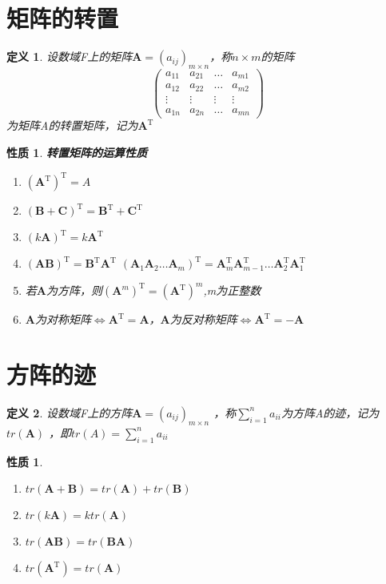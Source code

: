 \documentclass[a4paper]{ctexbook}
\newtheorem{definition}{定义}[section]
\newtheorem{property}[section]{性质}
\begin{document}
\section{矩阵的转置}
\begin{definition}
    设数域F上的矩阵\(\mathbf{A}=(a_{ij})_{m\times n}\)，称\(n\times m\)的矩阵
    \[\begin{pmatrix}
        a_{11}&a_{21}&\dots&a_{m1}
        \\a_{12}&a_{22}&\dots&a_{m2}
        \\ \vdots &\vdots &\vdots &\vdots
        \\a_{1n}&a_{2n}&\dots&a_{mn}
    \end{pmatrix}\]
    为矩阵A的转置矩阵，记为\(\mathbf{A}^\mathrm{T}\)
\end{definition}
\begin{property}
    \textbf{转置矩阵的运算性质}\\
    \begin{enumerate}
        \item \((\mathbf{A}^\mathrm{T})^\mathrm{T}=A\)
        \item \((\mathbf{B}+\mathbf{C})^\mathrm{T}=\mathbf{B}^\mathrm{T}+\mathbf{C}^\mathrm{T}\)
        \item \((k\mathbf{A})^\mathrm{T}=k\mathbf{A}^\mathrm{T}\)
        \item \((\mathbf{A}\mathbf{B})^\mathrm{T}=\mathbf{B}^\mathrm{T}\mathbf{A}^\mathrm{T}\)  \((\mathbf{A}_1\mathbf{A}_2\dots \mathbf{A}_m)^\mathrm{T}=\mathbf{A}_m^\mathrm{T}\mathbf{A}_{m-1}^\mathrm{T}\dots \mathbf{A}_2^\mathrm{T}\mathbf{A}_1^\mathrm{T}\)
        \item 若\(\mathbf{A}\)为方阵，则\((\mathbf{A}^m)^\mathrm{T}=(\mathbf{A}^\mathrm{T})^m\),m为正整数
        \item \(\mathbf{A}\)为对称矩阵\(\Leftrightarrow \mathbf{A}^\mathrm{T}=\mathbf{A}\)，\(\mathbf{A}\)为反对称矩阵\(\Leftrightarrow \mathbf{A}^\mathrm{T}=-\mathbf{A}\)
    \end{enumerate}
\end{property}

\section{方阵的迹}
\begin{definition}
    设数域F上的方阵\(\mathbf{A}=(a_{ij})_{m\times n}\) ，称\(\sum\limits_{i=1}^n a_{ii}\)为方阵A的迹，记为\(tr(\mathbf{A})\) ，即\(tr(A)=\sum\limits_{i=1}^n a_{ii}\)
\end{definition}
\begin{property}
    \begin{enumerate}
        \item \(tr(\mathbf{A}+\mathbf{B})=tr(\mathbf{A})+tr(\mathbf{B})\)
        \item \(tr(k\mathbf{A})=ktr(\mathbf{A})\)
        \item \(tr(\mathbf{A}\mathbf{B})=tr(\mathbf{B}\mathbf{A})\)
        \item \(tr(\mathbf{A}^\mathrm{T})=tr(\mathbf{A})\)
    \end{enumerate}
\end{property}
\end{document}

